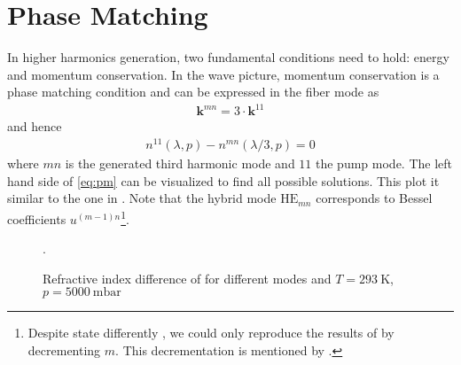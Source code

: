 \documentclass[fleqn, 10pt, twocolumn]{SelfArx}
\begin{document}
    \section{Phase Matching}
    In higher harmonics generation, two fundamental conditions need to hold: energy and momentum conservation. 
    In the wave picture, momentum conservation is a phase matching condition and can be expressed in the fiber mode as
    \begin{align}
        \mathbf{k}^{mn} = 3 \cdot \mathbf k^{11} 
    \end{align}
    and hence
    \begin{align}
        n^{11}(\lambda, p) - n^{mn}(\lambda / 3, p)= 0
        \label{eq:pm}
    \end{align}
    where $mn$ is the generated third harmonic mode and $11$ the pump mode. 
    The left hand side of \autoref{eq:pm} can be visualized to find all possible solutions. This plot it similar to the one in \cite{Nold2010}. 
    Note that the hybrid mode $\text{HE}_{mn}$ corresponds to Bessel coefficients $u^{(m-1)n}$\footnote{Despite \citeauthor{Travers2011} state differently \cite{Travers2011}, we could only reproduce the results of \citeauthor{Nold2010} by decrementing $m$. This decrementation is mentioned by \citeauthor{Marcatili1964} \cite{Marcatili1964}.}.
    \begin{figure}[h]
        \centering
        \caption{Refractive index difference of  for different  modes and $T=\SI{293}{\kelvin}$, $p=\SI{5000}{\milli\bar}$}.
        \label{plt:pm}
    \end{figure}
\end{document}
